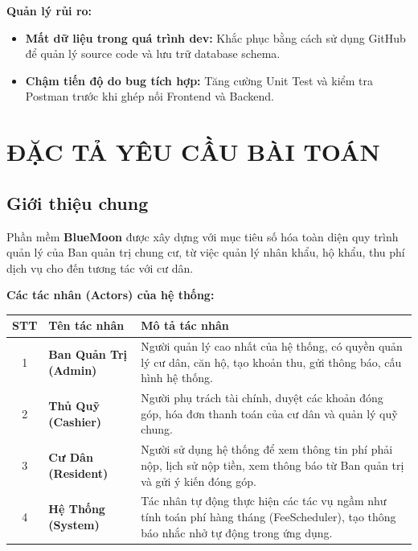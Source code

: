 \documentclass[12pt,a4paper]{article}
\begin{document}
\textbf{Quản lý rủi ro:}
\begin{itemize}
    \item \textbf{Mất dữ liệu trong quá trình dev:} Khắc phục bằng cách sử dụng GitHub để quản lý source code và lưu trữ database schema.
    \item \textbf{Chậm tiến độ do bug tích hợp:} Tăng cường Unit Test và kiểm tra Postman trước khi ghép nối Frontend và Backend.
\end{itemize}

\section{ĐẶC TẢ YÊU CẦU BÀI TOÁN}

\subsection{Giới thiệu chung}
Phần mềm \textbf{BlueMoon} được xây dựng với mục tiêu số hóa toàn diện quy trình quản lý của Ban quản trị chung cư, từ việc quản lý nhân khẩu, hộ khẩu, thu phí dịch vụ cho đến tương tác với cư dân.

\textbf{Các tác nhân (Actors) của hệ thống:}
\begin{table}[H]
    \centering
    \begin{tabularx}{\textwidth}{|c|l|X|}
    \hline
    \textbf{STT} & \textbf{Tên tác nhân} & \textbf{Mô tả tác nhân} \\
    \hline
    1 & \textbf{Ban Quản Trị (Admin)} & Người quản lý cao nhất của hệ thống, có quyền quản lý cư dân, căn hộ, tạo khoản thu, gửi thông báo, cấu hình hệ thống. \\
    \hline
    2 & \textbf{Thủ Quỹ (Cashier)} & Người phụ trách tài chính, duyệt các khoản đóng góp, hóa đơn thanh toán của cư dân và quản lý quỹ chung. \\
    \hline
    3 & \textbf{Cư Dân (Resident)} & Người sử dụng hệ thống để xem thông tin phí phải nộp, lịch sử nộp tiền, xem thông báo từ Ban quản trị và gửi ý kiến đóng góp. \\
    \hline
    4 & \textbf{Hệ Thống (System)} & Tác nhân tự động thực hiện các tác vụ ngầm như tính toán phí hàng tháng (FeeScheduler), tạo thông báo nhắc nhở tự động trong ứng dụng. \\
    \hline
    \end{tabularx}
\end{table}
\end{document}
